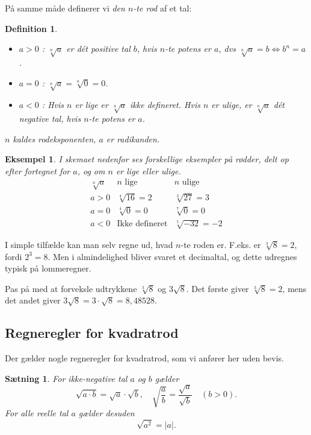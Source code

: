 \documentclass[12pt,oneside,a4paper]{article}
\theoremstyle{plain}
\newtheorem*{thm}{Sætning}
\newtheorem*{mydef}{Definition}
\newtheorem*{eks}{Eksempel}
\begin{document}
På samme måde definerer vi {\em den $n$-te rod} af et tal:
\begin{mydef}
    \leavevmode
    \begin{itemize}
        \item $a>0$ : $\sqrt[n]{a}$ er dét positive tal $b$, hvis $n$-te potens er
            $a$, dvs $\sqrt[n]{a} = b \Leftrightarrow b^n=a$.
        \item $a=0$ : $\sqrt[n]{a} = \sqrt[n]{0} =0$.
        \item $a<0$ : Hvis $n$ er lige er $\sqrt[n]{a}$ ikke defineret.  Hvis
            $n$ er ulige, er $\sqrt[n]{a}$ dét negative tal, hvis $n$-te potens
            er $a$.
    \end{itemize}

    $n$ kaldes {\em rodeksponenten}, $a$ er {\em radikanden}.
\end{mydef}

\begin{eks}
    I skemaet nedenfor ses forskellige eksempler på rødder, delt op efter
    fortegnet for $a$, og om $n$ er lige eller ulige.
    $$
    \begin{array}{r|c|l}
        \sqrt[n]{a} & \mbox{$n$ lige} & \mbox{$n$ ulige} \\
        \hline
        a > 0 & \sqrt[4]{16} = 2 & \sqrt[3]{27} = 3 \\
        \hline
        a = 0 & \sqrt[4]{0} = 0 & \sqrt[7]{0} = 0 \\
        \hline
        a < 0 & \mbox{Ikke defineret} & \sqrt[5]{-32} = -2
    \end{array}
    $$
\end{eks}

I simple tilfælde kan man selv regne ud, hvad $n$-te roden er. F.eks. er $\sqrt[3]{8}=2$,
fordi $2^3 = 8$. Men i almindelighed bliver svaret et decimaltal, og dette udregnes typisk
på lommeregner.

Pas på med at forveksle udtrykkene $\sqrt[3]{8}$ og $3\sqrt{8}$. Det første
giver $\sqrt[3]{8}=2$, mens det andet giver $3\sqrt{8}=3\cdot \sqrt{8} =
8,48528$.

\subsection*{Regneregler for kvadratrod}
Der gælder nogle regneregler for kvadratrod, som vi anfører her uden bevis.
\begin{thm}
    For ikke-negative tal $a$ og $b$ gælder
    $$
    \sqrt{a\cdot b} = \sqrt{a} \cdot \sqrt{b}, \quad
    \sqrt{\frac{a}{b}} = \frac{\sqrt{a}}{\sqrt{b}} \quad (b>0).
    $$
    For {\em alle} reelle tal $a$ gælder desuden
    $$
    \sqrt{a^2} = |a|.
    $$
\end{thm}
\end{document}

